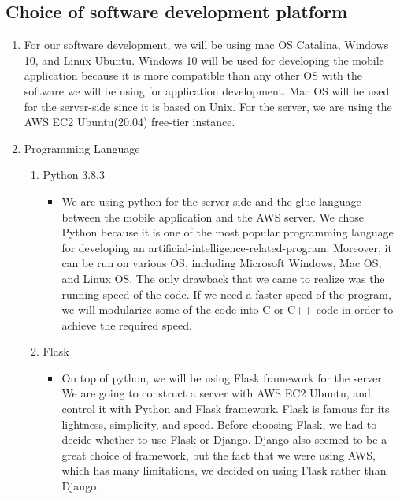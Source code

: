 \documentclass[conference]{IEEEtran}
\begin{document}
\subsection{Choice of software development platform}
\begin{enumerate}
    \item For our software development, we will be using mac OS Catalina, Windows 10, and Linux Ubuntu. Windows 10 will be used for developing the mobile application because it is more compatible than any other OS with the software we will be using for application development. Mac OS will be used for the server-side since it is based on Unix. For the server, we are using the AWS EC2 Ubuntu(20.04) free-tier instance.
    \item Programming Language
    \begin{enumerate}
    \item Python 3.8.3
        \begin{itemize}
            \item We are using python for the server-side and the glue language between the mobile application and the AWS server. We chose Python because it is one of the most popular programming language for developing an artificial-intelligence-related-program. Moreover, it can be run on various OS, including Microsoft Windows, Mac OS, and Linux OS. The only drawback that we came to realize was the running speed of the code. If we need a faster speed of the program, we will modularize some of the code into C or C++ code in order to achieve the required speed.
        \end{itemize}
    \item Flask
        \begin{itemize}
            \item On top of python, we will be using Flask framework for the server. We are going to construct a server with AWS EC2 Ubuntu, and control it with Python and Flask framework. Flask is famous for its lightness, simplicity, and speed. Before choosing Flask, we had to decide whether to use Flask or Django. Django also seemed to be a great choice of framework, but the fact that we were using AWS, which has many limitations, we decided on using Flask rather than Django.
        \end{itemize}

\end{enumerate}
\end{enumerate}
\end{document}
